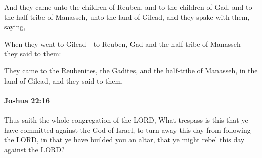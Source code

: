 			\begin{versebox}
					\item[BHS] 
					\item[ASV] And they came unto the children of Reuben, and to the children of Gad, and to the half-tribe of Manasseh, unto the land of Gilead, and they spake with them, saying,
					\item[NIV] When they went to Gilead—to Reuben, Gad and the half-tribe of Manasseh—they said to them:
					\item[NRSV] They came to the Reubenites, the Gadites, and the half-tribe of Manasseh, in the land of Gilead, and they said to them,
			\end{versebox}

		\paragraph{Joshua 22:16} %
			\label{JOSHUA-22-16}

			Thus saith the whole congregation of the LORD, What trespass is this that ye have committed against the God of Israel, to turn away this day from following the LORD, in that ye have builded you an altar, that ye might rebel this day against the LORD?

